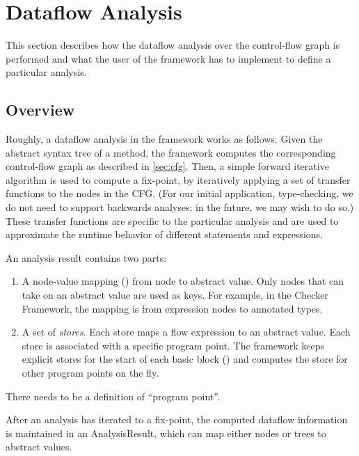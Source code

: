 \section{Dataflow Analysis}

This section describes how the dataflow analysis over the control-flow
graph is performed and what the user of the framework has to implement
to define a particular analysis.


\subsection{Overview}

Roughly, a dataflow analysis in the framework works as follows. Given
the abstract syntax tree of a method, the framework computes the
corresponding control-flow graph as described in
\autoref{sec:cfg}. Then, a simple forward iterative algorithm is used
to compute a fix-point, by iteratively applying a set of transfer
functions to the nodes in the CFG\@.  (For our initial application,
type-checking, we do not need to support backwards analyses; in the
future, we may wish to do so.)  These transfer functions are specific
to the particular analysis and are used to approximate the runtime
behavior of different statements and expressions.

An analysis result contains two parts:

\begin{enumerate}
\item
  A node-value mapping () from node to
  abstract value.  Only nodes that can take on an abstract value are
  used as keys.  For example, in the Checker Framework, the mapping is
  from expression nodes to annotated types.

\item
  A set of \emph{stores}.  Each store maps a flow expression to an
  abstract value.  Each store is associated with a specific program
  point.  The framework keeps explicit stores for the start of each
  basic block () and computes the store for
  other program points on the fly.
\end{enumerate}

\begin{workinprogress}
There needs to be a definition of ``program point''.
\end{workinprogress}


After an analysis has iterated to a fix-point, the computed dataflow
information is maintained in an AnalysisResult, which can map either
nodes or trees to abstract values.




